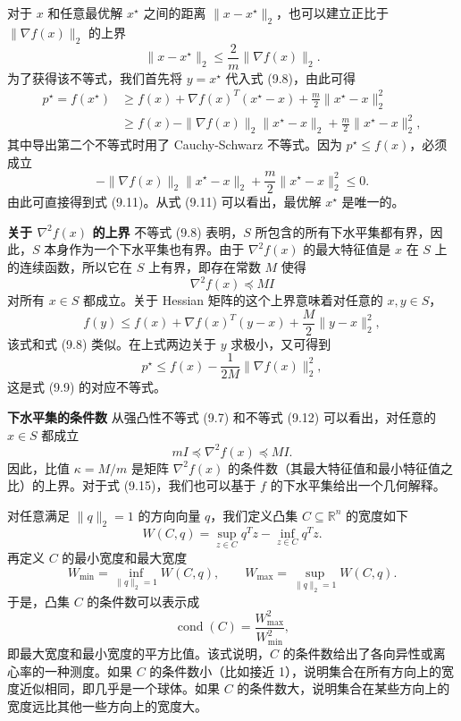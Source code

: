 \documentclass[UTF8, 12pt, fontset=fandol, oneside]{ctexart}
\begin{document}
对于 $x$ 和任意最优解 $x^\star$ 之间的距离 $\|x-x^\star\|_2$，也可以建立正比于 $\|\nabla f(x)\|_2$ 的上界
\begin{equation}
\|x-x^\star\|_2\leq\frac{2}{m}\|\nabla f(x)\|_2.
\tag{9.11}
\end{equation}
为了获得该不等式，我们首先将 $y=x^\star$ 代入式 (9.8)，由此可得
\[
\begin{aligned}
p^\star=f(x^\star)
&\geq f(x)+\nabla f(x)^T(x^\star-x)+\frac{m}{2}\|x^\star-x\|_2^2\\
&\geq f(x)-\|\nabla f(x)\|_2\|x^\star-x\|_2+\frac{m}{2}\|x^\star-x\|_2^2,
\end{aligned}
\]
其中导出第二个不等式时用了 Cauchy-Schwarz 不等式。因为 $p^\star\leq f(x)$，必须成立
\[
-\|\nabla f(x)\|_2\|x^\star-x\|_2+\frac{m}{2}\|x^\star-x\|_2^2\leq0.
\]
由此可直接得到式 (9.11)。从式 (9.11) 可以看出，最优解 $x^\star$ 是唯一的。

\noindent\textbf{关于 $\nabla^2 f(x)$ 的上界}\quad
不等式 (9.8) 表明，$S$ 所包含的所有下水平集都有界，因此，$S$ 本身作为一个下水平集也有界。由于 $\nabla^2 f(x)$ 的最大特征值是 $x$ 在 $S$ 上的连续函数，所以它在 $S$ 上有界，即存在常数 $M$ 使得
\begin{equation}
\nabla^2 f(x)\preceq MI
\tag{9.12}
\end{equation}
对所有 $x\in S$ 都成立。关于 Hessian 矩阵的这个上界意味着对任意的 $x,y\in S$，
\begin{equation}
f(y)\leq f(x)+\nabla f(x)^T(y-x)+\frac{M}{2}\|y-x\|_2^2,
\tag{9.13}
\end{equation}
该式和式 (9.8) 类似。在上式两边关于 $y$ 求极小，又可得到
\begin{equation}
p^\star\leq f(x)-\frac{1}{2M}\|\nabla f(x)\|_2^2,
\tag{9.14}
\end{equation}
这是式 (9.9) 的对应不等式。

\noindent\textbf{下水平集的条件数}\quad
从强凸性不等式 (9.7) 和不等式 (9.12) 可以看出，对任意的 $x\in S$ 都成立
\begin{equation}
mI\preceq\nabla^2 f(x)\preceq MI.
\tag{9.15}
\end{equation}
因此，比值 $\kappa=M/m$ 是矩阵 $\nabla^2 f(x)$ 的条件数（其最大特征值和最小特征值之比）的上界。对于式 (9.15)，我们也可以基于 $f$ 的下水平集给出一个几何解释。

对任意满足 $\|q\|_2=1$ 的方向向量 $q$，我们定义凸集 $C\subseteq\mathbb{R}^n$ 的宽度如下
\[
W(C,q)=\sup_{z\in C}q^Tz-\inf_{z\in C}q^Tz.
\]
再定义 $C$ 的最小宽度和最大宽度
\[
W_{\min}=\inf_{\|q\|_2=1}W(C,q),\qquad
W_{\max}=\sup_{\|q\|_2=1}W(C,q).
\]
于是，凸集 $C$ 的条件数可以表示成
\[
\operatorname{cond}(C)=\frac{W_{\max}^2}{W_{\min}^2},
\]
即最大宽度和最小宽度的平方比值。该式说明，$C$ 的条件数给出了各向异性或离心率的一种测度。如果 $C$ 的条件数小（比如接近 1），说明集合在所有方向上的宽度近似相同，即几乎是一个球体。如果 $C$ 的条件数大，说明集合在某些方向上的宽度远比其他一些方向上的宽度大。
\end{document}
